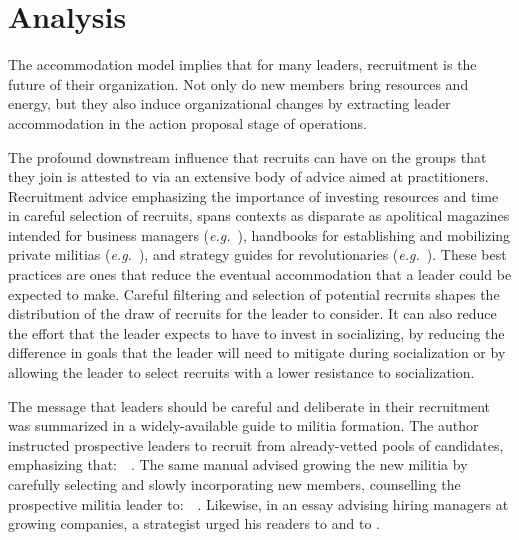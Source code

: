 \section{Analysis}
The accommodation model implies that for many leaders, recruitment is the future of their organization. Not only do new members bring resources and energy, but they also induce organizational changes by extracting leader accommodation in the action proposal stage of operations.

The profound downstream influence that recruits can have on the groups that they join is attested to via an extensive body of advice aimed at practitioners. Recruitment advice emphasizing the importance of investing resources and time in careful selection of recruits, spans contexts as disparate as apolitical magazines intended for business managers (\textit{e.g.}~\cite{patel2017tips, hall2012seven, connolly2015three}), handbooks for establishing and mobilizing private militias (\textit{e.g.}~\cite{westmoreland1994start, shayler2019how, croft2019how}), and strategy guides for revolutionaries (\textit{e.g.}~\cite{hammer, aqmanual}).  These best practices are ones that reduce the eventual accommodation that a leader could be expected to make.  Careful filtering and selection of potential recruits shapes the distribution of the draw of recruits for the leader to consider. It can also reduce the effort that the leader expects to have to invest in socializing, by reducing the difference in goals that the leader will need to mitigate during socialization or by allowing the leader to select recruits with a lower resistance to socialization. 

The message that leaders should be careful and deliberate in their recruitment was summarized in a widely-available guide to militia formation. The author instructed prospective leaders to recruit from already-vetted pools of candidates, emphasizing that:~~\autocite[4]{westmoreland1994start}.  The same manual advised growing the new militia by carefully selecting and slowly incorporating new members, counselling the prospective militia leader to:~~\autocite[5]{westmoreland1994start}. Likewise, in an essay advising hiring managers at growing companies, a strategist urged his readers to  and to \autocite{mckeown2014hire}.


